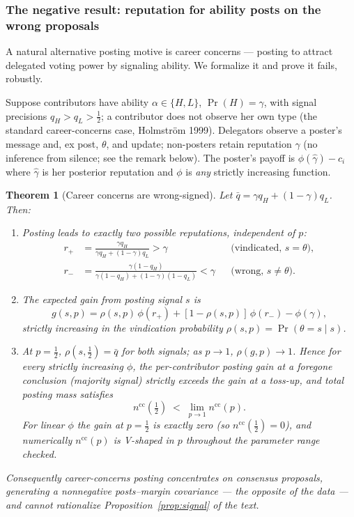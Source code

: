 \documentclass[12pt]{article}
\newtheorem{theorem}{Theorem}
\newcommand{\Pro}{\Pr}
\begin{document}
\subsubsection{The negative result: reputation for ability posts on the wrong proposals}

A natural alternative posting motive is career concerns --- posting to attract
delegated voting power by signaling ability. We formalize it and prove it
fails, robustly.

Suppose contributors have ability $\alpha\in\{H,L\}$, $\Pro(H)=\gamma$, with
signal precisions $q_H>q_L>\tfrac12$; a contributor does not observe her own
type (the standard career-concerns case, Holmstr\"om 1999). Delegators observe a
poster's message and, ex post, $\theta$, and update; non-posters retain
reputation $\gamma$ (no inference from silence; see the remark below). The
poster's payoff is $\phi(\hat\gamma)-c_i$ where $\hat\gamma$ is her posterior
reputation and $\phi$ is \emph{any} strictly increasing function.

\begin{theorem}[Career concerns are wrong-signed]\label{app:thm:career}
Let $\bar q=\gamma q_H+(1-\gamma)q_L$. Then:
\begin{enumerate}[label=(\alph*),itemsep=1pt]
\item Posting leads to exactly two possible reputations, independent of $p$:
\begin{align*}
r_+&=\frac{\gamma q_H}{\gamma q_H+(1-\gamma)q_L}>\gamma
&&\text{(vindicated, } s=\theta\text{)},\\
r_-&=\frac{\gamma(1-q_H)}{\gamma(1-q_H)+(1-\gamma)(1-q_L)}<\gamma
&&\text{(wrong, } s\ne\theta\text{)}.
\end{align*}
\item The expected gain from posting signal $s$ is
\[
g(s,p)=\rho(s,p)\,\phi(r_+)+[1-\rho(s,p)]\,\phi(r_-)-\phi(\gamma),
\]
strictly increasing in the vindication probability
$\rho(s,p)=\Pro(\theta=s\mid s)$.
\item At $p=\tfrac12$, $\rho(s,\tfrac12)=\bar q$ for both signals; as
$p\to1$, $\rho(g,p)\to1$. Hence for every strictly increasing $\phi$, the
per-contributor posting gain at a foregone conclusion (majority signal) strictly
exceeds the gain at a toss-up, and total posting mass satisfies
\[
n^{\mathrm{cc}}(\tfrac12)\;<\;\lim_{p\to1}n^{\mathrm{cc}}(p).
\]
For linear $\phi$ the gain at $p=\tfrac12$ is exactly zero (so
$n^{\mathrm{cc}}(\tfrac12)=0$), and numerically $n^{\mathrm{cc}}(p)$ is V-shaped
in $p$ throughout the parameter range checked.
\end{enumerate}
Consequently career-concerns posting concentrates on \emph{consensus}
proposals, generating a nonnegative posts--margin covariance --- the opposite
of the data --- and cannot rationalize Proposition~\ref{prop:signal} of the text.
\end{theorem}
\end{document}
